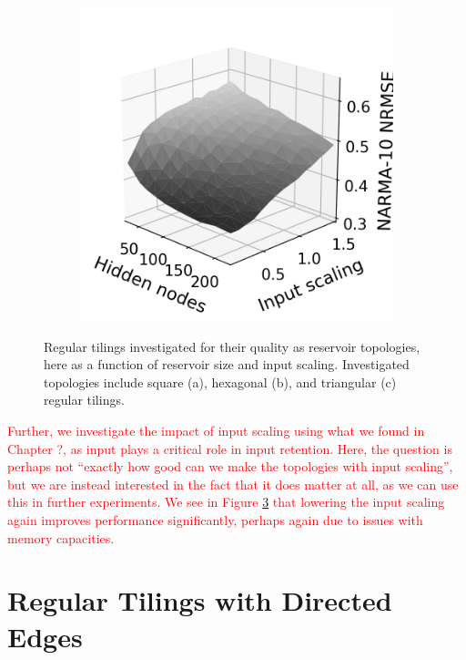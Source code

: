 \begin{figure}[t]
\begin{subfigure}{.32\textwidth}
    \caption{}
    \label{fig:rt-is-hex}
  \end{subfigure}
  \begin{subfigure}{.32\textwidth}
    \centering
    \includegraphics[width=1.0\linewidth]{figures/regular-tilings-performance-is-tri.png}
    \caption{}
    \label{fi:rt-is-tri}
  \end{subfigure}
  \caption{
    Regular tilings investigated for their quality as reservoir topologies, here
as a function of reservoir size and input scaling. Investigated topologies
include square (a), hexagonal (b), and triangular (c) regular tilings.
  }
  \label{fig:rt-performance-is}
\end{figure}

\textcolor{red}{
  Further, we investigate the impact of input scaling using what we found in
Chapter ?, as input plays a critical role in input retention. Here, the question
is perhaps not ``exactly how good can we make the topologies with input
scaling'', but we are instead interested in the fact that it does matter at all,
as we can use this in further experiments. We see in Figure
\ref{fig:rt-performance-is} that lowering the input scaling again improves
performance significantly, perhaps again due to issues with memory capacities.
}

\section{Regular Tilings with Directed Edges}

